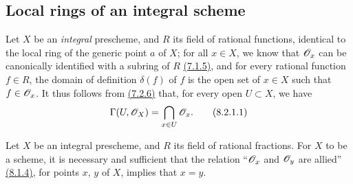 \subsection{Local rings of an integral scheme}
\label{subsection-local-rings-of-integral-scheme}

\begin{env}[8.2.1]
\label{env-1.8.2.1}
Let $X$ be an {\it integral} prescheme, and $R$ its field of
rational functions, identical to the local ring of the generic point $a$ of $X$;
for all $x\in X$, we know that $\mathscr{O}_x$ can be canonically identified with a
subring of $R$ \hyperref[env-1.7.1.5]{(7.1.5)}, and for every rational function $f\in R$, the
domain of definition $\delta(f)$ of $f$ is the open set of $x\in X$ such that
$f\in\mathscr{O}_x$. It thus follows from \hyperref[env-1.7.2.6]{(7.2.6)} that, for every open $U\subset X$,
we have
\[
  \Gamma(U,\mathscr{O}_X)=\bigcap_{x\in U}\mathscr{O}_x.
  \tag{8.2.1.1}
\]
\end{env}

\begin{prop}[8.2.2]
\label{prop-1.8.2.2}
Let $X$ be an integral prescheme,
and $R$ its field of rational fractions. For $X$ to be a scheme, it is
necessary and sufficient that the relation ``$\mathscr{O}_x$ and $\mathscr{O}_y$ are allied''
\hyperref[lem-1.8.1.4]{(8.1.4)}, for points $x$, $y$ of $X$, implies that $x=y$.
\end{prop}

